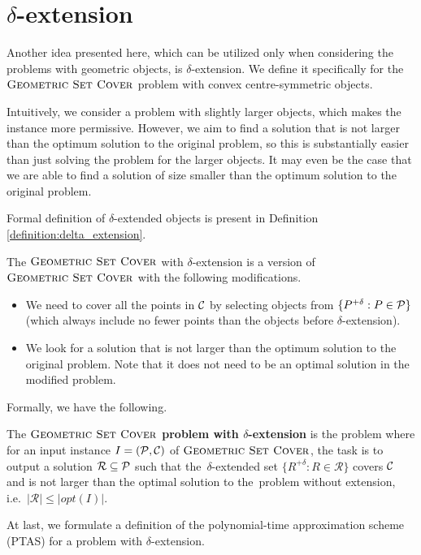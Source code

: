 \section{$\delta$-extension}
\label{section:def:delta_extension}

Another idea presented here, which can be utilized only when considering
the problems with geometric objects,
is $\delta$-extension.
We define it specifically for the $\textsc{Geometric Set Cover}$ problem
with convex centre-symmetric objects.

Intuitively, we consider a problem with slightly larger objects,
which makes the instance more permissive.
However, we aim to find a solution that
is not larger than the
optimum solution to the original problem,
so this is substantially easier than just
solving the problem for the larger objects.
It may even be the case
that we are able to find a solution
of size smaller than the optimum solution
to the original problem.

Formal definition of $\delta$-extended objects
is present in Definition
\ref{definition:delta_extension}.

The $\textsc{Geometric Set Cover}$ with $\delta$-extension
is a version of $\textsc{Geometric Set Cover}$ with
the following modifications.
\begin{itemize}
\item We need to cover all the points in $\mathcal{C}$
by selecting objects from $\{P^{+\delta} : P \in \mathcal{P}\}$ (which always 
include no fewer points than the objects
before $\delta$-extension).
\item We look for a solution that is not larger than the optimum
solution to the original problem.
Note that it does not need to be an optimal solution in
the modified problem.
\end{itemize}
Formally, we have the following.

\begin{defi}
The \textbf{$\textsc{Geometric Set Cover}$ problem
with $\delta$-extension} is the problem where for an input instance
$I=(\mathcal{P}, \mathcal{C})$ of $\textsc{Geometric Set Cover}$,
the task is to output a solution $\mathcal{R} \subseteq \mathcal{P}$
such that the~$\delta$-extended set
$\{ R^{+\delta} :  R \in \mathcal{R} \}$ covers $\mathcal{C}$
and is not larger than the optimal solution to the~problem without
extension, i.e.~$|\mathcal{R}| \le |opt(I)|$.
\end{defi}

At last, we formulate a definition of the
polynomial-time approximation scheme (PTAS)
for a problem with $\delta$-extension.

